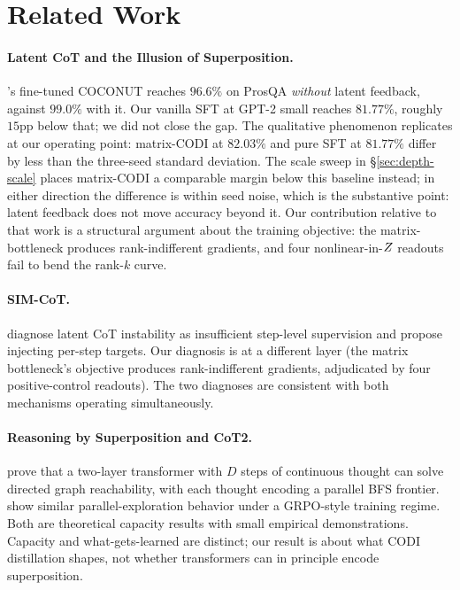 \section{Related Work}
\label{sec:related}

\paragraph{Latent CoT and the Illusion of Superposition.}
\citet{rizvi2026illusion}'s fine-tuned COCONUT reaches $96.6\%$ on
ProsQA \emph{without} latent feedback, against $99.0\%$ with it.
Our vanilla SFT at GPT-2 small reaches $81.77\%$, roughly $15$pp
below that; we did not close the gap. The qualitative phenomenon
replicates at our operating point: matrix-CODI at $82.03\%$ and
pure SFT at $81.77\%$ differ by less than the three-seed standard
deviation. The scale sweep in \S\ref{sec:depth-scale} places
matrix-CODI a comparable margin below this baseline instead; in
either direction the difference is within seed noise, which is the
substantive point: latent feedback does not move accuracy beyond it. Our
contribution relative to that work is a structural argument about
the training objective: the matrix-bottleneck produces
rank-indifferent gradients, and four nonlinear-in-$Z$ readouts
fail to bend the rank-$k$ curve.

\paragraph{SIM-CoT.}
\citet{shen2025simcot} diagnose latent CoT instability as
insufficient step-level supervision and propose injecting per-step
targets. Our diagnosis is at a different layer (the matrix
bottleneck's objective produces rank-indifferent gradients,
adjudicated by four positive-control readouts). The two diagnoses
are consistent with both mechanisms operating simultaneously.

\paragraph{Reasoning by Superposition and CoT2.}
\citet{zhu2025superposition} prove that a two-layer transformer
with $D$ steps of continuous thought can solve directed graph
reachability, with each thought encoding a parallel BFS frontier.
\citet{gozeten2025cot2} show similar parallel-exploration behavior
under a GRPO-style training regime. Both are theoretical capacity
results with small empirical demonstrations. Capacity and
what-gets-learned are distinct; our result is about what CODI
distillation shapes, not whether transformers can in principle
encode superposition.

